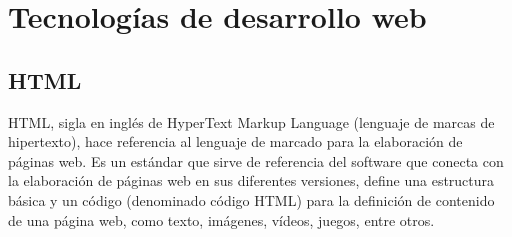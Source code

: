 
		
		
		
		



		
		




\section{Tecnologías de desarrollo web}

\subsection{HTML}

\setlength{\parskip}{5mm}

HTML, sigla en inglés de HyperText Markup Language (lenguaje de marcas de hipertexto), hace referencia al lenguaje de marcado para la elaboración de páginas web. Es un estándar que sirve de referencia del software que conecta con la elaboración de páginas web en sus diferentes versiones, define una estructura básica y un código (denominado código HTML) para la definición de contenido de una página web, como texto, imágenes, vídeos, juegos, entre otros. 

